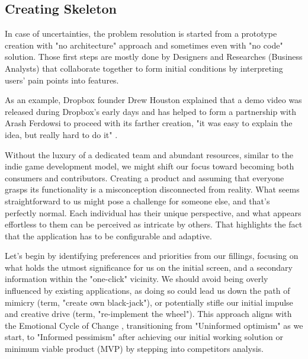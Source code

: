 
\subsection{Creating Skeleton}

In case of uncertainties, the problem resolution is started from a prototype creation with "no architecture" approach 
and sometimes even with "no code" solution. Those first steps are mostly done by Designers and Researches (Business 
Analysts) that collaborate together to form initial conditions by interpreting users' pain points into features.

As an example, Dropbox founder Drew Houston explained that a demo video was released during Dropbox's early days
and has helped to form a partnership with Arash Ferdowsi to proceed with its farther creation, "it was easy to explain 
the idea, but really hard to do it" \cite{Shon13}.

Without the luxury of a dedicated team and abundant resources, similar to the indie game development model, we might 
shift our focus toward becoming both consumers and contributors. Creating a product and assuming that everyone grasps 
its functionality is a misconception disconnected from reality. What seems straightforward to us might pose a challenge 
for someone else, and that's perfectly normal. Each individual has their unique perspective, and what appears effortless 
to them can be perceived as intricate by others. That highlights the fact that the application has to be configurable 
and adaptive.

Let's begin by identifying preferences and priorities from our fillings, focusing on what holds the utmost significance 
for us on the initial screen, and a secondary information within the "one-click" vicinity. We should avoid being overly 
influenced by existing applications, as doing so could lead us down the path of mimicry (term, "create own black-jack"), 
or potentially stifle our initial impulse and creative drive (term, "re-implement the wheel"). This approach aligns 
with the Emotional Cycle of Change \cite{Pfei79}, transitioning from "Uninformed optimism" as we start, to 
"Informed pessimism" after achieving our initial working solution or minimum viable product (MVP) by stepping into 
competitors analysis.

